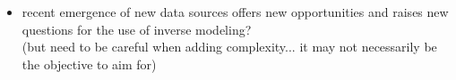 \documentclass[letterpaper,8pt]{extarticle}  %
\begin{document}
\begin{doublespacing}
\begin{linenumbers}
\begin{itemize}
 \item recent emergence of new data sources offers new opportunities and raises new questions for the use of inverse modeling? \\
 (but need to be careful when adding complexity... it may not necessarily be the objective to aim for)
    
\end{itemize}



\end{linenumbers}
\end{doublespacing}




\end{document}
